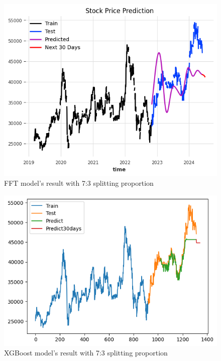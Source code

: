 \documentclass{ieeeojies}
\begin{document}
\begin{figure}[H]
  \centering
  \begin{minipage}{0.6\linewidth}
    \centering
    \includegraphics[width=\linewidth]{bibliography/diagram/FFT-BID.png}
    \caption{FFT model’s result with 7:3 splitting proportion}
    \label{fig8}
  \end{minipage}
\end{figure}

\begin{figure}[H]
  \centering
  \begin{minipage}{0.6\linewidth}
    \centering
    \includegraphics[width=\linewidth]{bibliography/diagram/XGBoost-BID.png}
    \caption{XGBoost model’s result with 7:3 splitting proportion}
    \label{fig8}
  \end{minipage}
\end{figure}
\end{document}
